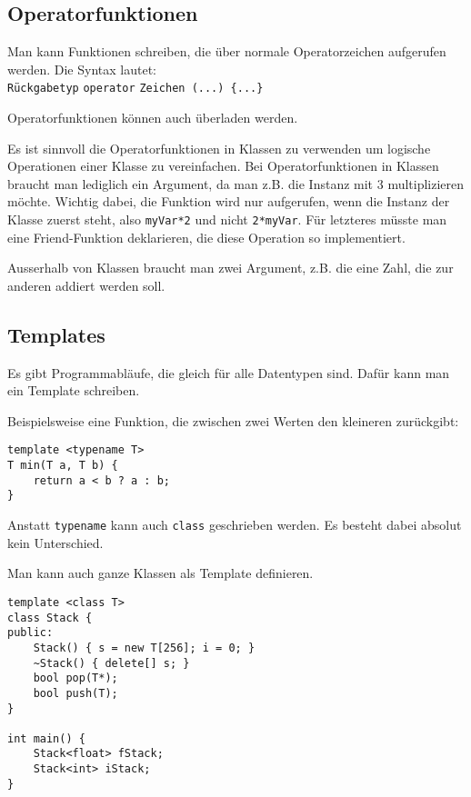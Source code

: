 \documentclass{article}
\newenvironment{code}
	{\begin{shaded}\vspace{-2.2mm}} 
	{\vspace{-5.0mm}\end{shaded}}
\begin{document}
\begin{multicols*}{3}
		\subsection{Operatorfunktionen} %
			Man kann Funktionen schreiben, die über normale Operatorzeichen aufgerufen werden. Die Syntax lautet: \\
			\verb!Rückgabetyp! \lstinline!operator! \verb!Zeichen (...) {...}!
			
			Operatorfunktionen können auch überladen werden.
			
			Es ist sinnvoll die Operatorfunktionen in Klassen zu verwenden um logische Operationen einer Klasse zu vereinfachen. Bei Operatorfunktionen in Klassen braucht man lediglich ein Argument, da man z.B. die Instanz mit 3 multiplizieren möchte. Wichtig dabei, die Funktion wird nur aufgerufen, wenn die Instanz der Klasse zuerst steht, also \lstinline!myVar*2! und nicht \lstinline!2*myVar!. Für letzteres müsste man eine Friend-Funktion deklarieren, die diese Operation so implementiert.
			
			Ausserhalb von Klassen braucht man zwei Argument, z.B. die eine Zahl, die zur anderen addiert werden soll.
		
		\subsection{Templates} %
			Es gibt Programmabläufe, die gleich für alle Datentypen sind. Dafür kann man ein Template schreiben.
			
			Beispielsweise eine Funktion, die zwischen zwei Werten den kleineren zurückgibt:
			\begin{code}
				\begin{lstlisting}[style=list]
template <typename T>
T min(T a, T b) {
	return a < b ? a : b;
}
				\end{lstlisting}
			\end{code}
			
			Anstatt \lstinline!typename! kann auch \lstinline!class! geschrieben werden. Es besteht dabei absolut kein Unterschied.
			
			Man kann auch ganze Klassen als Template definieren.
			\begin{code}
				\begin{lstlisting}[style=list]
template <class T>
class Stack {
public:
	Stack() { s = new T[256]; i = 0; }
	~Stack() { delete[] s; }
	bool pop(T*);
	bool push(T);
}

int main() {
	Stack<float> fStack;
	Stack<int> iStack;
}
				\end{lstlisting}
			\end{code}
		

\end{multicols*}
\end{document}
